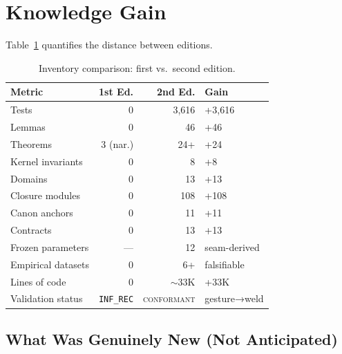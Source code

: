\documentclass[
  aps,
  prd,
  preprint,
  superscriptaddress,
  nofootinbib,
  floatfix,
  longbibliography
]{revtex4-2}
\newcommand{\INF}{\texttt{INF\_REC}}
\newcommand{\regime}[1]{\textrm{\upshape\scshape#1}}
\newcommand{\conform}{\regime{conformant}}
\begin{document}
\section{Knowledge Gain}\label{sec:gain}

Table~\ref{tab:gain} quantifies the distance between editions.

\begin{table}[t]
\centering
\small
\caption{Inventory comparison: first vs.\ second edition.}
\label{tab:gain}
\begin{tabular}{@{}lrrl@{}}
\toprule
\textbf{Metric} & \textbf{1st Ed.} & \textbf{2nd Ed.} & \textbf{Gain} \\
\midrule
Tests               & 0       & 3{,}616  & +3{,}616 \\
Lemmas              & 0       & 46       & +46 \\
Theorems            & 3 (nar.)& 24+      & +24 \\
Kernel invariants   & 0       & 8        & +8 \\
Domains             & 0       & 13       & +13 \\
Closure modules     & 0       & 108      & +108 \\
Canon anchors       & 0       & 11       & +11 \\
Contracts           & 0       & 13       & +13 \\
Frozen parameters   & —       & 12       & seam-derived \\
Empirical datasets  & 0       & 6+       & falsifiable \\
Lines of code       & 0       & $\sim$33K & +33K \\
Validation status   & \INF    & \conform{} & gesture→weld \\
\bottomrule
\end{tabular}
\end{table}

\subsection{What Was Genuinely New (Not Anticipated)}
\end{document}
